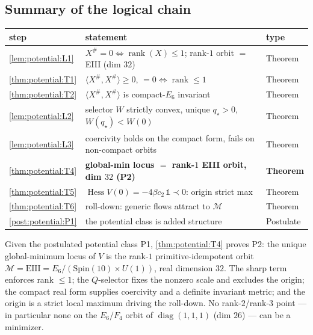 \subsection{Summary of the logical chain}
\label{sec:potential:summary}

\begin{center}
\begin{tabular}{lll}
\toprule
step & statement & type \\
\midrule
\autoref{lem:potential:L1} & $X^\#=0\iff\operatorname{rank}(X)\le1$; rank-$1$ orbit $=$ EIII (dim $32$) & Theorem \\
\autoref{thm:potential:T1} & $\langle X^\#,X^\#\rangle\ge0$, $=0\iff\operatorname{rank}\le1$ & Theorem \\
\autoref{thm:potential:T2} & $\langle X^\#,X^\#\rangle$ is compact-$E_6$ invariant & Theorem \\
\autoref{lem:potential:L2} & selector $W$ strictly convex, unique $q_\star>0$, $W(q_\star)<W(0)$ & Theorem \\
\autoref{lem:potential:L3} & coercivity holds on the compact form, fails on non-compact orbits & Theorem \\
\autoref{thm:potential:T4} & \textbf{global-min locus $=$ rank-$1$ EIII orbit, dim $32$ (P2)} & \textbf{Theorem} \\
\autoref{thm:potential:T5} & $\operatorname{Hess}V(0)=-4\beta c_2\,\mathbb1\prec0$: origin strict max & Theorem \\
\autoref{thm:potential:T6} & roll-down: generic flows attract to $\mathcal M$ & Theorem \\
\autoref{post:potential:P1} & the potential class is added structure & Postulate \\
\bottomrule
\end{tabular}
\end{center}

Given the postulated potential class P1, \autoref{thm:potential:T4} proves P2: the unique
global-minimum locus of $V$ is the rank-$1$ primitive-idempotent orbit
$\mathcal M=\mathrm{EIII}=E_6/(\mathrm{Spin}(10)\times U(1))$, real dimension $32$. The sharp
term enforces rank $\le1$; the $Q$-selector fixes the nonzero scale and excludes the origin;
the compact real form supplies coercivity and a definite invariant metric; and the origin is
a strict local maximum driving the roll-down. No rank-$2$/rank-$3$ point --- in particular
none on the $E_6/F_4$ orbit of $\operatorname{diag}(1,1,1)$ (dim $26$) --- can be a minimizer.
